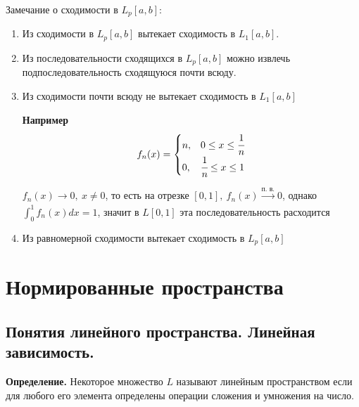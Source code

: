 \documentclass[14pt]{extarticle}
\theoremstyle{definition}
\theoremstyle{remark}
\newcommand{\be}{\begin{enumerate}}
\newcommand{\ee}{\end{enumerate}}
\renewcommand{\[}{\begin{dmath*}[compact]}
\renewcommand{\]}{\end{dmath*}}
\newcommand{\sep}{ , \ \allowbreak }
\newcommand{\tdef}{\textbf{Определение.} }
\begin{document}
Замечание о сходимости в $L_p[a,b]$:
\be
  \item Из сходимости в $L_p[a,b]$ вытекает сходимость в $L_1[a,b]$.
  \item Из последовательности сходящихся в $L_p[a,b]$ можно извлечь подпоследовательность сходящуюся почти всюду.
  \item Из сходимости почти всюду не вытекает сходимость в $L_1[a,b]$

  \textbf{Например}
  \[f_n(x)=\begin{cases} n, & 0 \leq x \leq \cfrac{1}{n} \\ 0, & \cfrac{1}{n} \leq x \leq 1 \end{cases}\]

  $f_n(x) \to 0 \sep x \neq 0$, то есть на отрезке $[0,1] \sep f_n(x) \xrightarrow[]{\text{п. в.}} 0$, однако $\int_0^1 f_n(x) dx = 1$, значит в $L[0,1]$ эта последовательность расходится
  \item Из равномерной сходимости вытекает сходимость в $L_p[a,b]$
\ee

\section{Нормированные пространства}

\subsection{Понятия линейного пространства. Линейная зависимость.}

\tdef Некоторое множество $L$ называют линейным пространством если для любого его элемента определены операции сложения и умножения на число.
\end{document}
